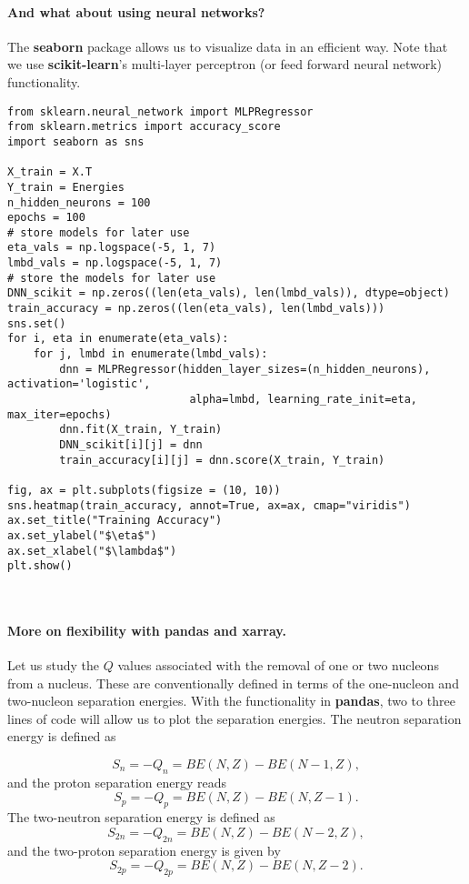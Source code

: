 \documentclass[%
oneside,                 %
final,                   %
10pt]{article}
\begin{document}
\paragraph{And what about using neural networks?}
The \textbf{seaborn} package allows us to visualize data in an efficient way. Note that we use \textbf{scikit-learn}'s multi-layer perceptron (or feed forward neural network) 
functionality.
\begin{verbatim}
from sklearn.neural_network import MLPRegressor
from sklearn.metrics import accuracy_score
import seaborn as sns

X_train = X.T
Y_train = Energies
n_hidden_neurons = 100
epochs = 100
# store models for later use
eta_vals = np.logspace(-5, 1, 7)
lmbd_vals = np.logspace(-5, 1, 7)
# store the models for later use
DNN_scikit = np.zeros((len(eta_vals), len(lmbd_vals)), dtype=object)
train_accuracy = np.zeros((len(eta_vals), len(lmbd_vals)))
sns.set()
for i, eta in enumerate(eta_vals):
    for j, lmbd in enumerate(lmbd_vals):
        dnn = MLPRegressor(hidden_layer_sizes=(n_hidden_neurons), activation='logistic',
                            alpha=lmbd, learning_rate_init=eta, max_iter=epochs)
        dnn.fit(X_train, Y_train)
        DNN_scikit[i][j] = dnn
        train_accuracy[i][j] = dnn.score(X_train, Y_train)

fig, ax = plt.subplots(figsize = (10, 10))
sns.heatmap(train_accuracy, annot=True, ax=ax, cmap="viridis")
ax.set_title("Training Accuracy")
ax.set_ylabel("$\eta$")
ax.set_xlabel("$\lambda$")
plt.show()



\end{verbatim}



\paragraph{More on flexibility with pandas and xarray.}
Let us study the $Q$ values associated with the removal of one or two nucleons from
a nucleus. These are conventionally defined in terms of the one-nucleon and two-nucleon
separation energies. With the functionality in \textbf{pandas}, two to three lines of code will allow us to plot the separation energies.
The neutron separation energy is defined as 

\[
S_n= -Q_n= BE(N,Z)-BE(N-1,Z),
\]
and the proton separation energy reads
\[
S_p= -Q_p= BE(N,Z)-BE(N,Z-1).
\]
The two-neutron separation energy is defined as
\[
S_{2n}= -Q_{2n}= BE(N,Z)-BE(N-2,Z),
\]
and  the two-proton separation energy is given by
\[
S_{2p}= -Q_{2p}= BE(N,Z)-BE(N,Z-2).
\]
\end{document}
